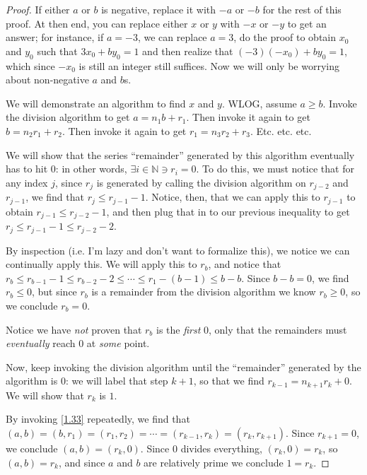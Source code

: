 \documentclass{article}
\numberwithin{equation}{thm}
\begin{document}
\begin{proof}
  If either $a$ or $b$ is negative, replace it with $-a$ or $-b$ for the rest of this proof. At then end, you can replace either $x$ or $y$ with $-x$ or $-y$ to get an answer; for instance, if $a = -3$, we can replace $a = 3$, do the proof to obtain $x_0$ and $y_0$ such that $3x_0 + by_0 = 1$ and then realize that $(-3)(-x_0) + by_0 = 1$, which since $-x_0$ is still an integer still suffices. Now we will only be worrying about non-negative $a$ and $b$s.

  We will demonstrate an algorithm to find $x$ and $y$. WLOG, assume $a \geq b$. Invoke the division algorithm to get $a = n_1 b + r_1$. Then invoke it again to get $b = n_2 r_1 + r_2$. Then invoke it again to get $r_1 = n_3 r_2 + r_3$. Etc. etc. etc.

  We will show that the series ``remainder'' generated by this algorithm eventually has to hit $0$: in other words, $\exists i \in \mathbb{N} \ni r_i = 0$. To do this, we must notice that for any index $j$, since $r_j$ is generated by calling the division algorithm on $r_{j-2}$ and $r_{j-1}$, we find that $r_j \leq r_{j-1}-1$.
  Notice, then, that we can apply this to $r_{j-1}$ to obtain $r_{j-1} \leq r_{j-2} - 1$, and then plug that in to our previous inequality to get $r_{j} \leq r_{j-1} - 1 \leq r_{j-2} - 2$.

  By inspection (i.e. I'm lazy and don't want to formalize this), we notice we can continually apply this. We will apply this to $r_b$, and notice that $r_b \leq r_{b-1} - 1 \leq r_{b-2} - 2 \leq \cdots \leq r_{1} - (b - 1) \leq b - b$. Since $b-b = 0$, we find $r_b \leq 0$, but since $r_b$ is a remainder from the division algorithm we know $r_b \geq 0$, so we conclude $r_b = 0$.

  Notice we have \emph{not} proven that $r_b$ is the \emph{first} $0$, only that the remainders must \emph{eventually} reach $0$ at \emph{some} point.

  Now, keep invoking the division algorithm until the ``remainder'' generated by the algorithm is $0$: we will label that step $k+1$, so that we find $r_{k-1} = n_{k+1} r_k + 0$. We will show that $r_k$ is $1$.

  By invoking \ref{1.33} repeatedly, we find that $(a, b) = (b, r_1) = (r_1, r_2) = \cdots = (r_{k-1}, r_k) = (r_k, r_{k+1})$. Since $r_{k+1} = 0$, we conclude $(a, b) = (r_k, 0)$. Since $0$ divides everything, $(r_k, 0) = r_k$, so $(a, b) = r_k$, and since $a$ and $b$ are relatively prime we conclude $1 = r_k$.


\end{proof}
\end{document}
